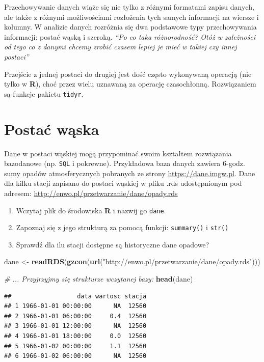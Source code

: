 \documentclass[]{book}
\newenvironment{Shaded}{\begin{snugshade}}{\end{snugshade}}
\newcommand{\KeywordTok}[1]{\textcolor[rgb]{0.13,0.29,0.53}{\textbf{#1}}}
\newcommand{\StringTok}[1]{\textcolor[rgb]{0.31,0.60,0.02}{#1}}
\newcommand{\CommentTok}[1]{\textcolor[rgb]{0.56,0.35,0.01}{\textit{#1}}}
\newcommand{\NormalTok}[1]{#1}
\providecommand{\tightlist}{%
  \setlength{\itemsep}{0pt}\setlength{\parskip}{0pt}}
\theoremstyle{definition}
\theoremstyle{definition}
\theoremstyle{definition}
\theoremstyle{remark}
\begin{document}
Przechowywanie danych wiąże się nie tylko z różnymi formatami zapisu
danych, ale także z różnymi możliwościami rozłożenia tych samych
informacji na wiersze i kolumny. W analizie danych rozróżnia się dwa
podstawowe typy przechowywania informacji: postać wąską i szeroką.
\emph{``Po co taka różnorodność? Otóż w zależności od tego co z danymi
chcemy zrobić czasem lepiej je mieć w takiej czy innej postaci''}
\citep{biecek2016}

Przejście z jednej postaci do drugiej jest dość często wykonywaną
operacją (nie tylko w \textbf{R}), choć przez wielu uznawaną za operację
czasochłonną. Rozwiązaniem są funkcje pakietu \texttt{tidyr}.

\section{Postać wąska}\label{postac-waska}

Dane w postaci wąskiej mogą przypominać swoim kształtem rozwiązania
bazodanowe (np. \texttt{SQL} i pokrewne). Przykładowa baza danych
zawiera 6-godz. sumy opadów atmosferycznych pobranych ze strony
\url{https://dane.imgw.pl}. Dane dla kilku stacji zapisano do postaci
wąskiej w pliku .rds udostępnionym pod adresem:
\url{http://enwo.pl/przetwarzanie/dane/opady.rds}

\begin{enumerate}
\def\labelenumi{\arabic{enumi}.}
\tightlist
\item
  Wczytaj plik do środowiska \textbf{R} i nazwij go \texttt{dane}.
\item
  Zapoznaj się z jego strukturą za pomocą funkcji: \texttt{summary()} i
  \texttt{str()}
\item
  Sprawdź dla ilu stacji dostępne są historyczne dane opadowe?
\end{enumerate}

\begin{Shaded}
\begin{Highlighting}[]
\NormalTok{dane <-}\StringTok{  }\KeywordTok{readRDS}\NormalTok{(}\KeywordTok{gzcon}\NormalTok{(}\KeywordTok{url}\NormalTok{(}\StringTok{"http://enwo.pl/przetwarzanie/dane/opady.rds"}\NormalTok{)))}

\CommentTok{# ... Przyjrzyjmy się strukturze wczytanej bazy:}
\KeywordTok{head}\NormalTok{(dane)}
\end{Highlighting}
\end{Shaded}

\begin{verbatim}
##                  data wartosc stacja
## 1 1966-01-01 00:00:00      NA  12560
## 2 1966-01-01 06:00:00     0.4  12560
## 3 1966-01-01 12:00:00      NA  12560
## 4 1966-01-01 18:00:00     0.0  12560
## 5 1966-01-02 00:00:00     1.1  12560
## 6 1966-01-02 06:00:00      NA  12560
\end{verbatim}
\end{document}
